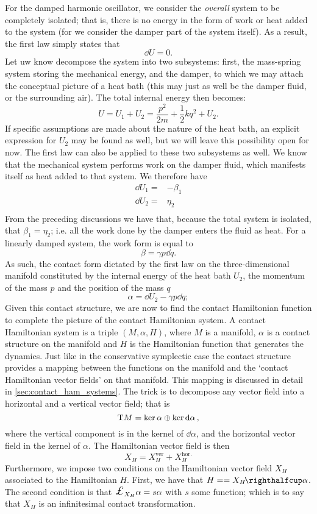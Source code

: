 For the damped harmonic oscillator, we consider the \emph{overall} system to be completely isolated; that is, there is no energy in the form of work or heat added to the system (for we consider the damper part of the system itself). As a result, the first law simply states that
$$ \dd{U} = 0. $$
Let uw know decompose the system into two subsystems: first, the mass-spring system storing the mechanical energy, and the damper, to which we may attach the conceptual picture of a heat bath (this may just as well be the damper fluid, or the surrounding air). The total internal energy then becomes:
$$ U = U_1 + U_2 = \frac{p^2}{2m} + \frac{1}{2}kq^2 + U_2. $$
If specific assumptions are made about the nature of the heat bath, an explicit expression for $U_2$ may be found as well, but we will leave this possibility open for now. The first law can also be applied to these two subsystems as well. We know that the mechanical system performs work on the damper fluid, which manifests itself as heat added to that system. We therefore have
\begin{equation}
    \begin{split}
        \dd{U}_1 =& -\beta_1 \\
        \dd{U}_2 =&  \eta_2 \\
    \end{split}
\end{equation}
From the preceding discussions we have that, because the total system is isolated, that $ \beta_1 = \eta_2 $; i.e. all the work done by the damper enters the fluid as heat. For a linearly damped system, the work form is equal to 
$$ \beta = \gamma p \dd{q}. $$
As such, the contact form dictated by the first law on the three-dimensional manifold constituted by the internal energy of the heat bath $U_2$, the momentum of the mass $p$ and the position of the mass $q$
\begin{equation}
    \alpha = \dd{U}_2 - \gamma p \dd{q};
    \label{eq:dho_contact_form_thermo}
\end{equation}
Given this contact structure, we are now to find the contact Hamiltonian function to complete the picture of the contact Hamiltonian system. A contact Hamiltonian system is a triple $(M, \alpha, H)$, where $M$ is a manifold, $\alpha$ is a contact structure on the manifold and $H$ is the Hamiltonian function that generates the dynamics. Just like in the conservative symplectic case the contact structure provides a mapping between the functions on the manifold and the `contact Hamiltonian vector fields' on that manifold. This mapping is discussed in detail in \cref{sec:contact_ham_systems}. The trick is to decompose any vector field into a horizontal and a vertical vector field; that is
$$ \mathrm{T}M = \ker \alpha \oplus \ker \dd{\alpha},$$
where the vertical component is in the kernel of $ \dd{\alpha}$, and the horizontal vector field in the kernel of $ \alpha $. The Hamiltonian vector field is then 
$$ X_H = X_H^\text{ver} + X_H^\text{hor.} $$
Furthermore, we impose two conditions on the Hamiltonian vector field $X_H$ associated to the Hamiltonian $H$. First, we have that $ H = = \intpr{X_H}{\alpha} $. The second condition is that $\lied{X_H}\alpha = s \alpha $ with $s$ some function; which is to say that $X_H$ is an infinitesimal contact transformation. 


